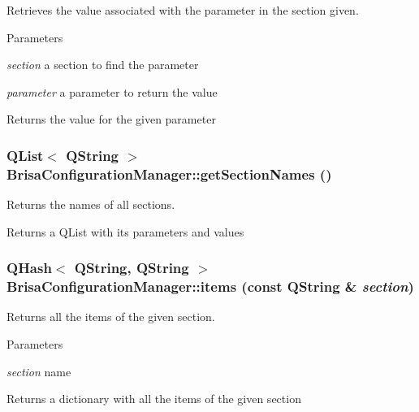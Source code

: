 Retrieves the value associated with the parameter in the section given. 
\begin{DoxyParams}{Parameters}
\item[{\em section}]a section to find the parameter \item[{\em parameter}]a parameter to return the value \end{DoxyParams}
\begin{DoxyReturn}{Returns}
the value for the given parameter 
\end{DoxyReturn}
\hypertarget{classBrisaCore_1_1BrisaConfigurationManager_a6a9e2549510762f81e592a51c805ab6e}{
\subsubsection[{getSectionNames}]{\setlength{\rightskip}{0pt plus 5cm}QList$<$ QString $>$ BrisaConfigurationManager::getSectionNames ()}}
\label{classBrisaCore_1_1BrisaConfigurationManager_a6a9e2549510762f81e592a51c805ab6e}


Returns the names of all sections. \begin{DoxyReturn}{Returns}
a QList with its parameters and values 
\end{DoxyReturn}
\hypertarget{classBrisaCore_1_1BrisaConfigurationManager_adac936cafe02d040a4a69fe96ec0e64d}{
\subsubsection[{items}]{\setlength{\rightskip}{0pt plus 5cm}QHash$<$ QString, QString $>$ BrisaConfigurationManager::items (const QString \& {\em section})}}
\label{classBrisaCore_1_1BrisaConfigurationManager_adac936cafe02d040a4a69fe96ec0e64d}


Returns all the items of the given section. 
\begin{DoxyParams}{Parameters}
\item[{\em section}]name \end{DoxyParams}
\begin{DoxyReturn}{Returns}
a dictionary with all the items of the given section 
\end{DoxyReturn}


